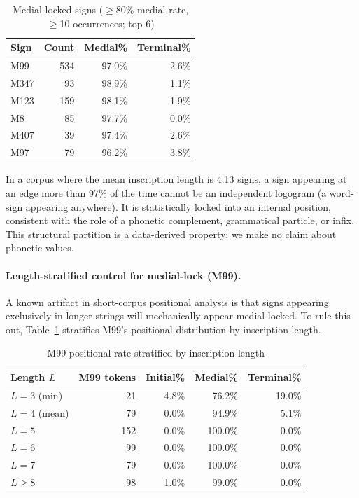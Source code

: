 \documentclass[12pt,letterpaper]{article}
\begin{document}
\begin{table}[H]
\centering
\caption{Medial-locked signs ($\geq$80\% medial rate, $\geq$10 occurrences; top 6)}
\begin{tabular}{lrrr}
\toprule
Sign & Count & Medial\% & Terminal\% \\
\midrule
M99  & 534 & 97.0\% & 2.6\% \\
M347 &  93 & 98.9\% & 1.1\% \\
M123 & 159 & 98.1\% & 1.9\% \\
M8   &  85 & 97.7\% & 0.0\% \\
M407 &  39 & 97.4\% & 2.6\% \\
M97  &  79 & 96.2\% & 3.8\% \\
\bottomrule
\end{tabular}
\end{table}

In a corpus where the mean inscription length is 4.13 signs, a sign
appearing at an edge more than 97\% of the time cannot be an
independent logogram (a word-sign appearing anywhere).
It is statistically locked into an internal position, consistent with
the role of a phonetic complement, grammatical particle, or infix.
This structural partition is a data-derived property; we make no claim
about phonetic values.

\paragraph{Length-stratified control for medial-lock (M99).}
A known artifact in short-corpus positional analysis is that signs
appearing exclusively in longer strings will mechanically appear
medial-locked.
To rule this out, Table~\ref{tab:m99length} stratifies M99's positional
distribution by inscription length.

\begin{table}[htbp]
\centering
\caption{M99 positional rate stratified by inscription length}
\label{tab:m99length}
\begin{tabular}{lrrrr}
\toprule
Length $L$ & M99 tokens & Initial\% & Medial\% & Terminal\% \\
\midrule
$L = 3$ (min)  &  21 &  4.8\% & 76.2\% & 19.0\% \\
$L = 4$ (mean) &  79 &  0.0\% & 94.9\% &  5.1\% \\
$L = 5$        & 152 &  0.0\% &100.0\% &  0.0\% \\
$L = 6$        &  99 &  0.0\% &100.0\% &  0.0\% \\
$L = 7$        &  79 &  0.0\% &100.0\% &  0.0\% \\
$L \ge 8$      &  98 &  1.0\% & 99.0\% &  0.0\% \\
\bottomrule
\end{tabular}
\end{table}
\end{document}
